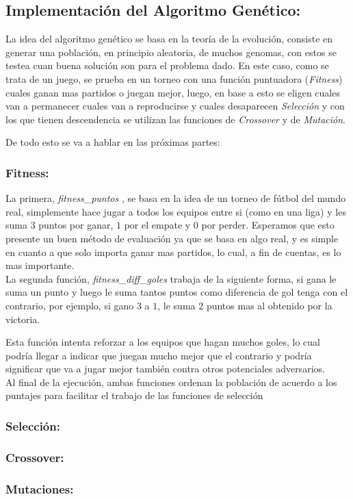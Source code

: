 \subsection{Implementación del Algoritmo Genético:}

La idea del algoritmo genético se basa en la teoría de la evolución, consiste en generar una población,
en principio aleatoria, de muchos genomas, con estos se testea cuan buena solución son para el problema dado.
En este caso, como se trata de un juego, se prueba en un torneo con una función puntuadora
(\emph{Fitness}) cuales ganan mas partidos o juegan mejor, luego, en base a esto se eligen cuales van a permanecer
cuales van a reproducirse y cuales desaparecen \emph{Selección} y con los que tienen descendencia se utilizan
las funciones de \emph{Crossover} y de \emph{Mutación}.

De todo esto se va a hablar en las próximas partes:

\subsubsection{Fitness:}


La primera, \emph{fitness\_puntos} , se basa en la idea de un torneo de fútbol del mundo real, simplemente hace jugar a todos
los equipos entre si (como en una liga) y les suma $3$ puntos por ganar, $1$ por el empate y $0$ por perder.
Esperamos que esto presente un buen método de evaluación ya que se basa en algo real, y es simple en cuanto a que solo importa ganar
mas partidos, lo cual, a fin de cuentas, es lo mas importante.\\

La segunda función, \emph{fitness\_diff\_goles} trabaja de la siguiente forma, si gana le suma un punto y luego le suma tantos
puntos como diferencia de gol tenga con el contrario, por ejemplo, si gano $3$ a $1$, le suma $2$ puntos mas al obtenido por
la victoria.

Esta función intenta reforzar a los equipos que hagan muchos goles, lo cual podría llegar a indicar que juegan mucho mejor que el
contrario y podría significar que va a jugar mejor también contra otros potenciales adversarios.\\

Al final de la ejecución, ambas funciones ordenan la población de acuerdo a los puntajes para facilitar el trabajo de las funciones
de selección


\subsubsection{Selección:}


\subsubsection{Crossover:}


\subsubsection{Mutaciones:}


